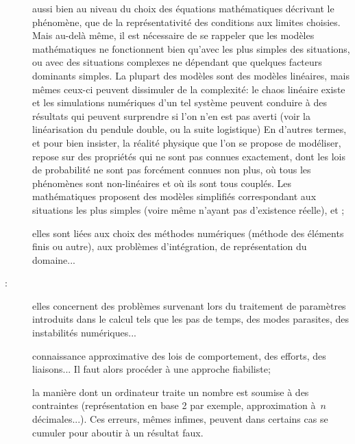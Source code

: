 \begin{description}
  \item[] aussi bien au niveau du choix des équations mathématiques décrivant le phénomène, que de la représentativité des conditions aux limites choisies. Mais au-delà même, il est nécessaire de se rappeler que les modèles mathématiques ne fonctionnent bien qu'avec les plus simples des situations, ou avec des situations complexes ne dépendant que quelques facteurs dominants simples. La plupart des modèles sont des modèles linéaires, mais mêmes ceux-ci peuvent dissimuler de la complexité: le chaos linéaire existe et les simulations numériques d'un tel système peuvent conduire à des résultats qui peuvent surprendre si l'on n'en est pas averti (voir la linéarisation du pendule double, ou la suite logistique)
  En d'autres termes, et pour bien insister, la réalité physique que l'on se propose de modéliser, repose sur des propriétés qui ne sont pas connues exactement, dont les lois de probabilité ne sont pas forcément connues non plus, où tous les phénomènes sont non-linéaires et où ils sont tous couplés. Les mathématiques proposent des modèles simplifiés correspondant aux situations les plus simples (voire même n'ayant pas d'existence réelle), et ;
  \item[] elles sont liées aux choix des méthodes numériques (méthode des éléments finis ou autre), aux problèmes d'intégration, de représentation du domaine...
  \item[:] elles concernent des problèmes survenant lors du traitement de paramètres introduits dans le calcul tels que les pas de temps, des modes parasites, des instabilités numériques...
  \item[] connaissance approximative des lois de comportement, des efforts, des liaisons... Il faut alors procéder à une approche fiabiliste;
  \item[] la manière dont un ordinateur traite un nombre est soumise à des contraintes (représentation en base 2 par exemple, approximation à~$n$ décimales...). Ces erreurs, mêmes infimes, peuvent dans certains cas se cumuler pour aboutir à un résultat faux.
\end{description}


